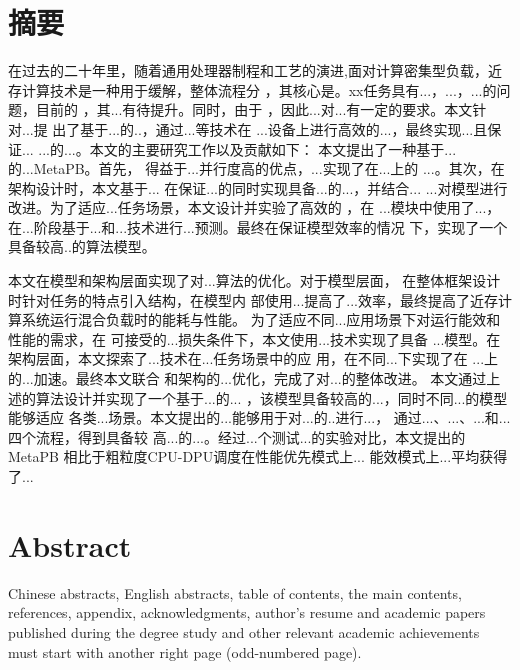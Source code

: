 
\maketitle%
\MAKETITLE%
\makedeclaration%
\intobmk\chapter*{摘\quad 要}%
\setcounter{page}{1}%
在过去的二十年里，随着通用处理器制程和工艺的演进,面对计算密集型负载，近存计算技术是一种用于缓解，整体流程分
，其核心是。xx任务具有...，...，...的问题，目前的
，其...有待提升。同时，由于
，因此...对...有一定的要求。本文针对...提
出了基于...的..，通过...等技术在
...设备上进行高效的...，最终实现...且保证...
...的...。本文的主要研究工作以及贡献如下：
本文提出了一种基于...的...MetaPB。首先，
得益于...并行度高的优点，...实现了在...上的
...。其次，在架构设计时，本文基于...
在保证...的同时实现具备...的...，并结合...
...对模型进行改进。为了适应...任务场景，本文设计并实验了高效的
，在 ...模块中使用了...，在...阶段基于...和...技术进行...预测。最终在保证模型效率的情况
下，实现了一个具备较高..的算法模型。

本文在模型和架构层面实现了对...算法的优化。对于模型层面，
在整体框架设计时针对任务的特点引入结构，在模型内
部使用...提高了...效率，最终提高了近存计算系统运行混合负载时的能耗与性能。
为了适应不同...应用场景下对运行能效和性能的需求，在
可接受的...损失条件下，本文使用...技术实现了具备
...模型。在架构层面，本文探索了...技术在...任务场景中的应
用，在不同...下实现了在 ...上的...加速。最终本文联合
和架构的...优化，完成了对...的整体改进。
本文通过上述的算法设计并实现了一个基于...的...
，该模型具备较高的...，同时不同...的模型能够适应
各类...场景。本文提出的...能够用于对...的..进行...，
通过...、...、...和...四个流程，得到具备较
高...的...。经过...个测试...的实验对比，本文提出的 MetaPB
相比于粗粒度CPU-DPU调度在性能优先模式上... 能效模式上...平均获得了...


\intobmk\chapter*{Abstract}%

Chinese abstracts, English abstracts, table of contents, the main contents, references, appendix, acknowledgments, author's resume and academic papers published during the degree study and other relevant academic achievements must start with another right page (odd-numbered page).


\pagestyle{enfrontmatterstyle}%
\cleardoublepage\pagestyle{frontmatterstyle}%

